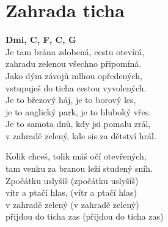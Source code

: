 \section{Zahrada ticha}
\onehalfspacing

\textbf{Dmi, C, F, C, G}\\
Je tam brána zdobená, cestu otevírá,\\
zahradu zelenou všechno připomíná.\\
Jako dým závojů mlhou opředených,\\
vstupuješ do ticha cestou vyvolených.\\

Je to březový háj, je to borový les,\\
je to anglický park, je to hluboký vřes.\\
Je to samota dnů, kdy jsi pomalu zrál,\\
v zahradě zelený, kde sis za dětství hrál.\\

\singlespacing


Kolik chceš, tolik máš očí otevřených,\\
tam venku za branou leží studený sníh.\\
Zpočátku uslyšíš (zpočátku uslyšíš) \\
vítr a ptačí hlas, (vítr a ptačí hlas)\\
v zahradě zelený (v zahradě zelený) \\
přijdou do ticha zas (přijdou do ticha zas)\\


